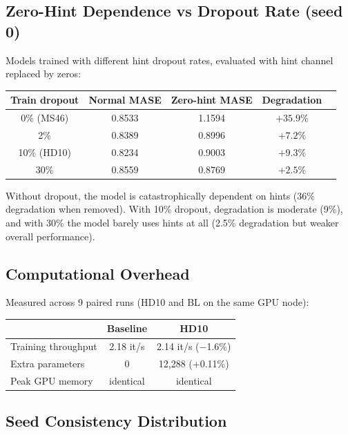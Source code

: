 \documentclass[11pt]{article}
\begin{document}
\subsection{Zero-Hint Dependence vs Dropout Rate (seed 0)}

Models trained with different hint dropout rates, evaluated with hint channel replaced by zeros:

\begin{table}[h]
\centering
\small
\begin{tabular}{ccccc}
\toprule
\textbf{Train dropout} & \textbf{Normal MASE} & \textbf{Zero-hint MASE} & \textbf{Degradation} \\
\midrule
0\% (MS46) & 0.8533 & 1.1594 & $+35.9\%$ \\
2\% & 0.8389 & 0.8996 & $+7.2\%$ \\
10\% (HD10) & 0.8234 & 0.9003 & $+9.3\%$ \\
30\% & 0.8559 & 0.8769 & $+2.5\%$ \\
\bottomrule
\end{tabular}
\end{table}

Without dropout, the model is catastrophically dependent on hints (36\% degradation when removed). With 10\% dropout, degradation is moderate (9\%), and with 30\% the model barely uses hints at all (2.5\% degradation but weaker overall performance).

\subsection{Computational Overhead}

Measured across 9 paired runs (HD10 and BL on the same GPU node):

\begin{table}[h]
\centering
\small
\begin{tabular}{lcc}
\toprule
& \textbf{Baseline} & \textbf{HD10} \\
\midrule
Training throughput & 2.18 it/s & 2.14 it/s ($-$1.6\%) \\
Extra parameters & 0 & 12,288 ($+$0.11\%) \\
Peak GPU memory & identical & identical \\
\bottomrule
\end{tabular}
\end{table}

\subsection{Seed Consistency Distribution}
\end{document}
